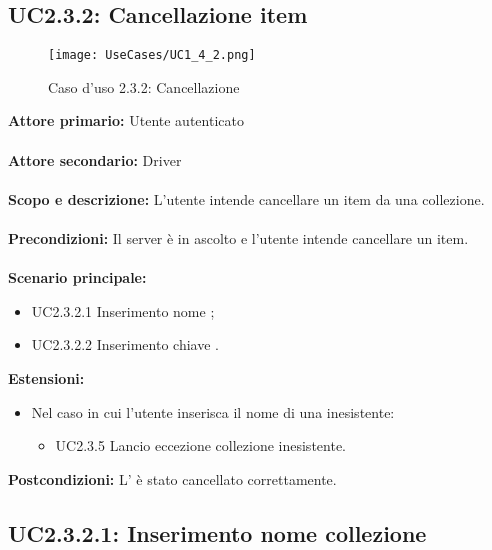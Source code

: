 \documentclass{scalatekids-article}
\begin{document}
\subsection{UC2.3.2: Cancellazione item}

\begin{figure}[H]
  \begin{center}
    \texttt{[image: UseCases/UC1\_4\_2.png]}
    \caption*{Caso d'uso 2.3.2: Cancellazione }
  \end{center}
\end{figure}
\textbf{Attore primario:} Utente autenticato\\ \\
\textbf{Attore secondario:} Driver\\ \\
\textbf{Scopo e descrizione:} L'utente intende cancellare un item da una collezione.\\ \\
\textbf{Precondizioni:} Il server è in ascolto e l'utente intende cancellare un item.\\ \\
\textbf{Scenario principale:}
\begin{itemize}
  \item UC2.3.2.1 Inserimento nome ;
  \item UC2.3.2.2 Inserimento chiave .
\end{itemize}
\textbf{Estensioni:}
\begin{itemize}
  \item Nel caso in cui l'utente inserisca il nome di una  inesistente:
  \begin{itemize}
    \item UC2.3.5 Lancio eccezione collezione inesistente.
  \end{itemize}
\end{itemize}
\textbf{Postcondizioni:} L' è stato cancellato correttamente.

\subsection{UC2.3.2.1: Inserimento nome collezione}
\end{document}
